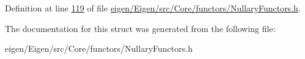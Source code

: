 Definition at line \hyperlink{eigen_2_eigen_2src_2_core_2functors_2_nullary_functors_8h_source_l00119}{119} of file \hyperlink{eigen_2_eigen_2src_2_core_2functors_2_nullary_functors_8h_source}{eigen/\+Eigen/src/\+Core/functors/\+Nullary\+Functors.\+h}.



The documentation for this struct was generated from the following file\+:\begin{DoxyCompactItemize}
\item 
eigen/\+Eigen/src/\+Core/functors/\+Nullary\+Functors.\+h\end{DoxyCompactItemize}
